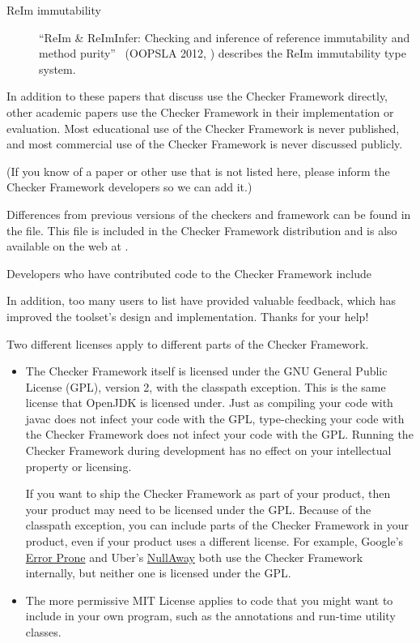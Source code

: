 \begin{description}
\item[ReIm immutability]
``ReIm \& ReImInfer: Checking and inference of reference immutability and method purity''~\cite{HuangMDE2012} (OOPSLA 2012, )
            describes the ReIm immutability type system.

\end{description}

In addition to these papers that discuss use the Checker Framework
directly, other academic papers use the Checker Framework in their
implementation or evaluation.
Most educational use of the Checker
Framework is never published, and most commercial use of the Checker
Framework is never discussed publicly.

(If you know of a paper or other use that is not listed here, please inform
the Checker Framework developers so we can add it.)



Differences from previous versions of the checkers and framework can be found
in the  file.  This file is included in the
Checker Framework distribution and is also available on the web at
.

Developers who have contributed code to the Checker Framework include

In addition, too many users to list have provided valuable feedback, which
has improved the toolset's design and implementation.
Thanks for your help!



Two different licenses apply to different parts of the Checker Framework.
\begin{itemize}
\item
The Checker Framework itself is licensed under the GNU General Public License
(GPL), version 2, with the classpath exception.
This is the same license that OpenJDK is licensed
under.  Just as compiling your code with javac does not infect your code
with the GPL, type-checking your code with the Checker Framework does not
infect your code with the GPL\@.  Running the Checker Framework during
development has no effect on your intellectual property or licensing.

If you want to ship the Checker Framework as part of your product, then
your product may need to be licensed under the GPL\@.  Because of the
classpath exception, you can include parts of the Checker Framework in your
product, even if your product uses a different license.  For example,
Google's \href{https://github.com/google/error-prone}{Error Prone} and
Uber's \href{https://github.com/uber/NullAway}{NullAway} both use the
Checker Framework internally, but neither one is licensed under the GPL\@.

\item
The more permissive MIT License applies
to code that you might want to include in your own
program, such as the annotations and run-time utility classes.
\end{itemize}

